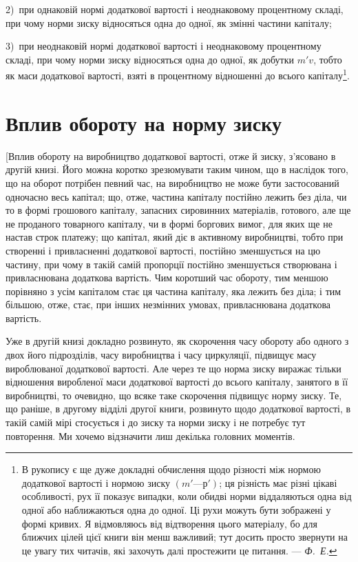 \parcont{}  %
2)~при однаковій нормі додаткової вартості і неоднаковому
процентному складі, при чому норми зиску відносяться одна до
одної, як змінні частини капіталу;

3)~при неоднаковій нормі додаткової вартості і неоднаковому
процентному складі, при чому норми зиску відносяться одна до
одної, як добутки $m'v$, тобто як маси додаткової вартості,
взяті в процентному відношенні до всього капіталу\footnote{
В рукопису є ще дуже докладні обчислення щодо різності між нормою
додаткової вартості і нормою зиску $(m' — р')$; ця різність має різні цікаві особливості,
рух її показує випадки, коли обидві норми віддаляються одна від
одної або наближаються одна до одної. Ці рухи можуть бути зображені у формі
кривих. Я відмовляюсь від відтворення цього матеріалу, бо для ближчих цілей
цієї книги він менш важливий; тут досить просто звернути на це увагу тих
читачів, які захочуть далі простежити це питання. — \emph{Ф.~Е.}
}.

\section{Вплив обороту на норму зиску}

[Вплив обороту на виробництво додаткової вартості, отже
й зиску, з’ясовано в другій книзі. Його можна коротко зрезюмувати
таким чином, що в наслідок того, що на оборот потрібен
певний час, на виробництво не може бути застосований одночасно
весь капітал; що, отже, частина капіталу постійно лежить без
діла, чи то в формі грошового капіталу, запасних сировинних
матеріалів, готового, але ще не проданого товарного капіталу,
чи в формі боргових вимог, для яких ще не настав строк платежу;
що капітал, який діє в активному виробництві, тобто при
створенні і привласненні додаткової вартості, постійно зменшується
на цю частину, при чому в такій самій пропорції постійно
зменшується створювана і привласнювана додаткова вартість.
Чим коротший час обороту, тим меншою порівняно з усім
капіталом стає ця частина капіталу, яка лежить без діла; і тим
більшою, отже, стає, при інших незмінних умовах, привласнювана
додаткова вартість.

Уже в другій книзі докладно розвинуто, як скорочення часу
обороту або одного з двох його підрозділів, часу виробництва
і часу циркуляції, підвищує масу вироблюваної додаткової вартості.
Але через те що норма зиску виражає тільки відношення
виробленої маси додаткової вартості до всього капіталу, занятого
в її виробництві, то очевидно, що всяке таке скорочення підвищує
норму зиску. Те, що раніше, в другому відділі другої
книги, розвинуто щодо додаткової вартості, в такій самій мірі
стосується і до зиску та норми зиску і не потребує тут повторення.
Ми хочемо відзначити лиш декілька головних моментів.

